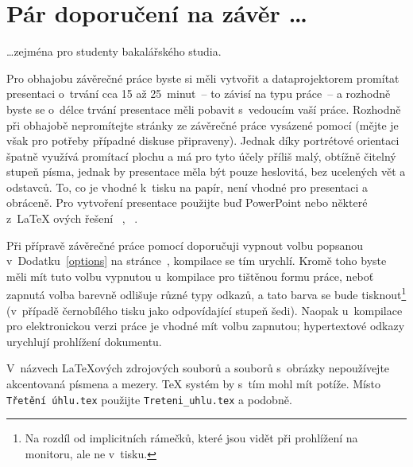 
\chapter*{Pár doporučení na závěr \ldots}\label{conclus}%

\ldots zejména pro studenty bakalářského studia.

Pro obhajobu závěrečné práce byste si měli vytvořit a dataprojektorem promítat
presentaci o~trvání cca 15 až 25~minut~-- to závisí na typu práce~-- a
rozhodně byste se o~délce trvání presentace měli pobavit s~vedoucím vaší
práce. Rozhodně při obhajobě nepromítejte stránky ze závěrečné práce vysázené
pomocí \pkg{\ipotname} (mějte je však pro potřeby případné diskuse
připraveny). Jednak díky portrétové orientaci špatně využívá promítací plochu
a má pro tyto účely příliš malý, obtížně čitelný stupeň písma, jednak by
presentace měla být pouze heslovitá, bez ucelených vět a odstavců. To, co je
vhodné k~tisku na papír, není vhodné pro presentaci a obráceně. Pro vytvoření
presentace použijte buď PowerPoint nebo některé z~\LaTeX
ových řešení
~\cite{Rad:LIVE:CTAN:pdfscreen},
~\cite{samc:LIVE:CTAN:beamer}.

Při přípravě závěrečné práce pomocí \pkg{\ipotname} doporučuji vypnout volbu
 popsanou v~Dodatku~\ref{options} na stránce~\pageref{opthtext},
kompilace se tím urychlí. Kromě toho byste měli mít tuto volbu vypnutou
u~kompilace pro tištěnou formu práce, neboť zapnutá volba  barevně
odlišuje různé typy odkazů, a tato barva se bude tisknout\footnote{Na rozdíl
  od implicitních rámečků, které jsou vidět při prohlížení na monitoru, ale ne
  v~tisku.}  (v~případě černobílého tisku jako odpovídající stupeň
šedi). Naopak u~kompilace pro elektronickou verzi práce je vhodné mít volbu
 zapnutou; hypertextové odkazy urychlují prohlížení dokumentu.

V~názvech \LaTeX ových zdrojových souborů a
souborů s~obrázky nepoužívejte akcentovaná písmena a mezery.  \TeX{} systém by
s~tím mohl mít potíže. Místo \verb!Třetění úhlu.tex! použijte
\verb!Treteni_uhlu.tex! a podobně.

